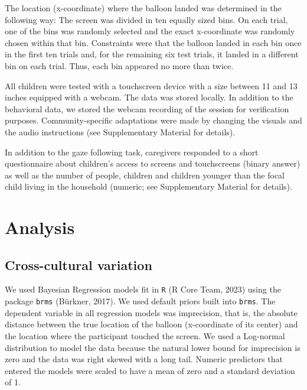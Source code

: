 \documentclass[
  man,floatsintext]{apa7}
\begin{document}
The location (x-coordinate) where the balloon landed was determined in the following way: The screen was divided in ten equally sized bins. On each trial, one of the bins was randomly selected and the exact x-coordinate was randomly chosen within that bin. Constraints were that the balloon landed in each bin once in the first ten trials and, for the remaining six test trials, it landed in a different bin on each trial. Thus, each bin appeared no more than twice.

All children were tested with a touchscreen device with a size between 11 and 13 inches equipped with a webcam. The data was stored locally. In addition to the behavioral data, we stored the webcam recording of the session for verification purposes. Community-specific adaptations were made by changing the visuals and the audio instructions (see Supplementary Material for details).

In addition to the gaze following task, caregivers responded to a short questionnaire about children's access to screens and touchscreens (binary answer) as well as the number of people, children and children younger than the focal child living in the household (numeric; see Supplementary Material for details).

\section{Analysis}\label{analysis}

\subsection{Cross-cultural variation}\label{cross-cultural-variation}

We used Bayesian Regression models fit in \texttt{R} (R Core Team, 2023) using the package \texttt{brms} (Bürkner, 2017). We used default priors built into \texttt{brms}. The dependent variable in all regression models was imprecision, that is, the absolute distance between the true location of the balloon (x-coordinate of its center) and the location where the participant touched the screen. We used a Log-normal distribution to model the data because the natural lower bound for imprecision is zero and the data was right skewed with a long tail. Numeric predictors that entered the models were scaled to have a mean of zero and a standard deviation of 1.
\end{document}
